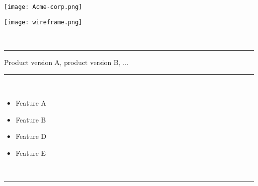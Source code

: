 	\begin{titlepage}
	\begin{flushright}
		\texttt{[image: Acme-corp.png]}
	\end{flushright}
	\vfil
	\begin{center}
		\texttt{[image: wireframe.png]}
	\end{center}
	\vfil
	\Huge
	\productname \\
	\rule{\textwidth}{1pt}
	\Large
	Product version A, product version B, $\ldots$\\
	\rule{\textwidth}{1pt}\\[0.5em]
	\begin{minipage}{0.5\textwidth}
		\begin{itemize}
			\item Feature A
			\item Feature B
		\end{itemize}
	\end{minipage}
	\hfill
	\begin{minipage}{0.5\textwidth}
		\begin{flushright}
			\begin{itemize}
				\item Feature D
				\item Feature E
			\end{itemize}
		\end{flushright}
	\end{minipage}
	\\[0.5em]
	\rule{\textwidth}{1pt}\\[0.5em]
	\begin{minipage}{0.5\textwidth}
		\begin{flushleft}
			\documentid\\
			\publicationdate
		\end{flushleft}
	\end{minipage}
	\hfill
	\begin{minipage}{0.5\textwidth}
		\begin{flushright}
			\manufacturer\\ 
			\publicationtype
		\end{flushright}		
	\end{minipage}
\end{titlepage}